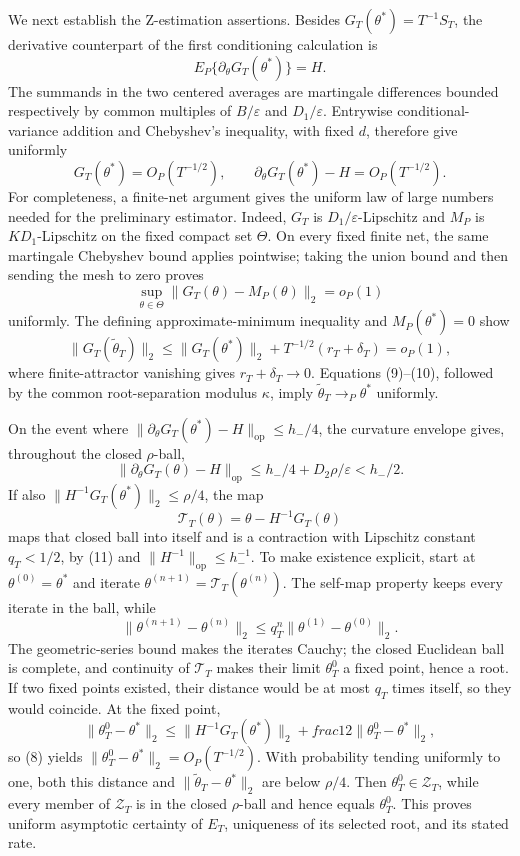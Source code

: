 We next establish the Z-estimation assertions.  Besides \(G_T(\theta^*)=T^{-1}S_T\), the derivative counterpart of the first conditioning calculation is
\[
 E_P\{\partial_\theta G_T(\theta^*)\}=H.
\]
The summands in the two centered averages are martingale differences bounded respectively by common multiples of \(B/\varepsilon\) and \(D_1/\varepsilon\).  Entrywise conditional-variance addition and Chebyshev's inequality, with fixed \(d\), therefore give uniformly
\[
 G_T(\theta^*)=O_P(T^{-1/2}),
 \qquad
 \partial_\theta G_T(\theta^*)-H=O_P(T^{-1/2}).                            \tag{8}
\]
For completeness, a finite-net argument gives the uniform law of large numbers needed for the preliminary estimator.  Indeed, \(G_T\) is \(D_1/\varepsilon\)-Lipschitz and \(M_P\) is \(KD_1\)-Lipschitz on the fixed compact set \(\Theta\).  On every fixed finite net, the same martingale Chebyshev bound applies pointwise; taking the union bound and then sending the mesh to zero proves
\[
 \sup_{\theta\in\Theta}\|G_T(\theta)-M_P(\theta)\|_2=o_P(1)               \tag{9}
\]
uniformly.  The defining approximate-minimum inequality and \(M_P(\theta^*)=0\) show
\[
 \|G_T(\widetilde\theta_T)\|_2
 \le \|G_T(\theta^*)\|_2+T^{-1/2}(r_T+\delta_T)=o_P(1),                  \tag{10}
\]
where finite-attractor vanishing gives \(r_T+\delta_T\to0\).  Equations (9)--(10), followed by the common root-separation modulus \(\kappa\), imply \(\widetilde\theta_T\to_P\theta^*\) uniformly.

On the event where \(\|\partial_\theta G_T(\theta^*)-H\|_{\mathrm{op}}\le h_-/4\), the curvature envelope gives, throughout the closed \(\rho\)-ball,
\[
 \|\partial_\theta G_T(\theta)-H\|_{\mathrm{op}}
 \le h_-/4+D_2\rho/\varepsilon<h_-/2.                                    \tag{11}
\]
If also \(\|H^{-1}G_T(\theta^*)\|_2\le\rho/4\), the map
\[
 \mathcal T_T(\theta)=\theta-H^{-1}G_T(\theta)
\]
maps that closed ball into itself and is a contraction with Lipschitz constant \(q_T<1/2\), by (11) and \(\|H^{-1}\|_{\mathrm{op}}\le h_-^{-1}\).  To make existence explicit, start at \(\theta^{(0)}=\theta^*\) and iterate \(\theta^{(n+1)}=\mathcal T_T(\theta^{(n)})\).  The self-map property keeps every iterate in the ball, while
\[
 \|\theta^{(n+1)}-\theta^{(n)}\|_2\le q_T^n\|\theta^{(1)}-\theta^{(0)}\|_2.
\]
The geometric-series bound makes the iterates Cauchy; the closed Euclidean ball is complete, and continuity of \(\mathcal T_T\) makes their limit \(\theta_T^0\) a fixed point, hence a root.  If two fixed points existed, their distance would be at most \(q_T\) times itself, so they would coincide.  At the fixed point,
\[
 \|\theta_T^0-\theta^*\|_2
 \le \|H^{-1}G_T(\theta^*)\|_2+  frac12\|\theta_T^0-\theta^*\|_2,
\]
so (8) yields \(\|\theta_T^0-\theta^*\|_2=O_P(T^{-1/2})\).  With probability tending uniformly to one, both this distance and \(\|\widetilde\theta_T-\theta^*\|_2\) are below \(\rho/4\).  Then \(\theta_T^0\in\mathcal Z_T\), while every member of \(\mathcal Z_T\) is in the closed \(\rho\)-ball and hence equals \(\theta_T^0\).  This proves uniform asymptotic certainty of \(E_T\), uniqueness of its selected root, and its stated rate.

